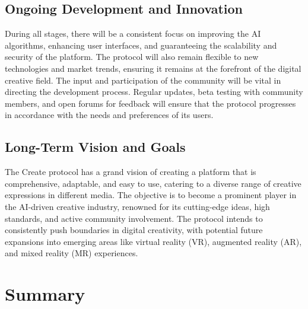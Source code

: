 \documentclass[12pt,a4paper]{article}
\begin{document}
\subsection{Ongoing Development and Innovation}

During all stages, there will be a consistent focus on improving the AI algorithms, enhancing user interfaces, and guaranteeing the scalability and security of the platform. The protocol will also remain flexible to new technologies and market trends, ensuring it remains at the forefront of the digital creative field. The input and participation of the community will be vital in directing the development process. Regular updates, beta testing with community members, and open forums for feedback will ensure that the protocol progresses in accordance with the needs and preferences of its users.

\subsection{Long-Term Vision and Goals}

The Create protocol has a grand vision of creating a platform that is comprehensive, adaptable, and easy to use, catering to a diverse range of creative expressions in different media. The objective is to become a prominent player in the AI-driven creative industry, renowned for its cutting-edge ideas, high standards, and active community involvement. The protocol intends to consistently push boundaries in digital creativity, with potential future expansions into emerging areas like virtual reality (VR), augmented reality (AR), and mixed reality (MR) experiences.

\noindent{}

\pagebreak

\section{Summary}
\end{document}
